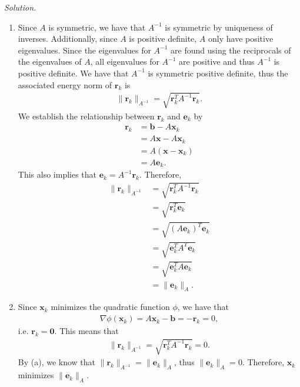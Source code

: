 \documentclass[12pt]{article}
\newcommand{\solution}{\vspace{2 ex} \hspace{-5 ex} \emph{Solution.} }
\begin{document}
\vspace{-2 ex} \solution
\begin{enumerate}[leftmargin=0.6cm,label=(\alph*)]
	\item Since $ A $ is symmetric, we have that $ A^{-1} $ is symmetric by uniqueness of inverses. Additionally, since $ A $ is positive definite, $ A $ only have positive eigenvalues. Since the eigenvalues for $ A^{-1} $ are found using the reciprocals of the eigenvalues of $ A $, all eigenvalues for $ A^{-1} $ are positive and thus $ A^{-1} $ is positive definite. We have that $ A^{-1} $ is symmetric positive definite, thus the associated energy norm of $ \textbf{r}_k $ is
	\begin{align*}
	\lVert \textbf{r}_k \rVert_{A^{-1}} = \sqrt{\textbf{r}_k^TA^{-1}\textbf{r}_k}.
	\end{align*}
	We establish the relationship between $ \textbf{r}_k $ and $ \textbf{e}_k $ by
	\begin{align*}
	\textbf{r}_k &= \textbf{b} - A\textbf{x}_k \\
	&= A\textbf{x} - A\textbf{x}_k \\
	&= A(\textbf{x}-\textbf{x}_k) \\
	&= A\textbf{e}_k.
	\end{align*}
	This also implies that $ \textbf{e}_k = A^{-1}\textbf{r}_k $. Therefore,
	\begin{align*}
	\lVert \textbf{r}_k \rVert_{A^{-1}} &= \sqrt{\textbf{r}_k^TA^{-1}\textbf{r}_k} \\
	&= \sqrt{\textbf{r}_k^T\textbf{e}_k} \\
	&= \sqrt{(A\textbf{e}_k)^T\textbf{e}_k} \\
	&= \sqrt{\textbf{e}_k^TA^T\textbf{e}_k} \\
	&= \sqrt{\textbf{e}_k^TA\textbf{e}_k} \\
	&= \lVert \textbf{e}_k \rVert_{A}.  
	\end{align*} 
	\item Since $ \textbf{x}_k $ minimizes the quadratic function $ \phi $, we have that 
	\begin{align*}
	\nabla \phi(\textbf{x}_k) = A\textbf{x}_k - \textbf{b} = -\textbf{r}_k = 0, 
	\end{align*}
	i.e. $ \textbf{r}_k = \textbf{0} $. This means that
	\begin{align*}
	\lVert \textbf{r}_k \rVert_{A^{-1}} = \sqrt{\textbf{r}_k^TA^{-1}\textbf{r}_k} = 0.
	\end{align*}
	By (a), we know that $ \lVert \textbf{r}_k \rVert_{A^{-1}} = \lVert \textbf{e}_k \rVert_{A}$, thus $ \lVert \textbf{e}_k \rVert_{A} = 0 $. Therefore, $ \textbf{x}_k $ minimizes $ \lVert \textbf{e}_k \rVert_{A} $. 
\end{enumerate}
\end{document}
